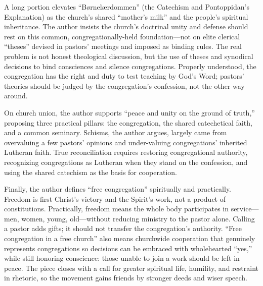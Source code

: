 A long portion elevates “Børnelærdommen” (the Catechism and Pontoppidan’s Explanation) as the church’s shared “mother’s milk” and the people’s spiritual inheritance. The author insists the church’s doctrinal unity and defense should rest on this common, congregationally-held foundation—not on elite clerical “theses” devised in pastors’ meetings and imposed as binding rules. The real problem is not honest theological discussion, but the use of theses and synodical decisions to bind consciences and silence congregations. Properly understood, the congregation has the right and duty to test teaching by God’s Word; pastors’ theories should be judged by the congregation’s confession, not the other way around.

On church union, the author supports “peace and unity on the ground of truth,” proposing three practical pillars: the congregation, the shared catechetical faith, and a common seminary. Schisms, the author argues, largely came from overvaluing a few pastors’ opinions and under-valuing congregations’ inherited Lutheran faith. True reconciliation requires restoring congregational authority, recognizing congregations as Lutheran when they stand on the confession, and using the shared catechism as the basis for cooperation.

Finally, the author defines “free congregation” spiritually and practically. Freedom is first Christ’s victory and the Spirit’s work, not a product of constitutions. Practically, freedom means the whole body participates in service—men, women, young, old—without reducing ministry to the pastor alone. Calling a pastor adds gifts; it should not transfer the congregation’s authority. “Free congregation in a free church” also means churchwide cooperation that genuinely represents congregations so decisions can be embraced with wholehearted “yes,” while still honoring conscience: those unable to join a work should be left in peace. The piece closes with a call for greater spiritual life, humility, and restraint in rhetoric, so the movement gains friends by stronger deeds and wiser speech.